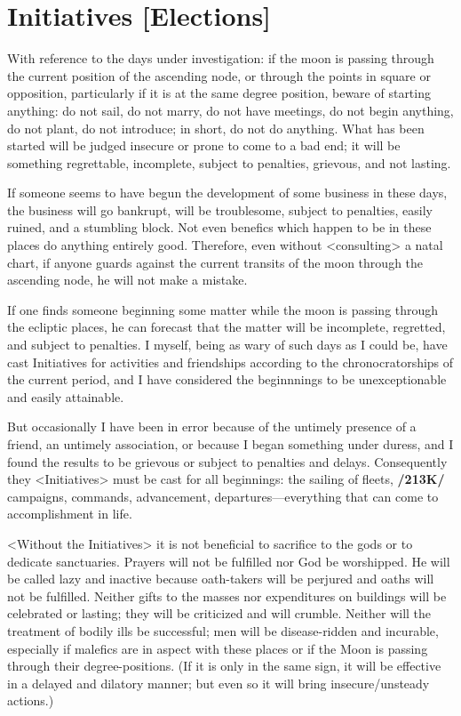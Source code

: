 \section{Initiatives [Elections]}

With reference to the days under investigation: if the moon is passing through the current position of the ascending node, or through the points in square or opposition, particularly if it is at the same degree position, beware of starting anything: do not sail, do not marry, do not have meetings, do not begin anything, do not plant, do not introduce; in short, do not do anything. What has been started will be judged insecure or prone to come to a bad end; it will be something regrettable, incomplete, subject to penalties, grievous, and not lasting.
 
 If someone seems to have begun the development of some business in these days, the business will go bankrupt, will be troublesome, subject to penalties, easily ruined, and a stumbling block. Not even benefics which happen to be in these places do anything entirely good.
Therefore, even without <consulting> a natal chart, if anyone guards against the current transits of the moon through the ascending node, he will not make a mistake.

If one finds someone beginning some matter while the moon is passing through the ecliptic places, he can forecast that the matter will be incomplete, regretted, and subject to penalties. I myself, being as wary of such days as I could be, have cast Initiatives for activities and friendships according to the chronocratorships of the current period, and I have considered the beginnnings to be unexceptionable and easily attainable. 

But occasionally I have been in error because of the untimely presence of a friend, an untimely association, or because I began something under duress, and I found the results to be grievous or subject to
penalties and delays. Consequently they <Initiatives> must be cast for all beginnings: the sailing of fleets, \textbf{/213K/} campaigns, commands, advancement, departures—everything that can come to accomplishment in life. 

<Without the Initiatives> it is not beneficial to sacrifice to the gods or to dedicate sanctuaries.  Prayers will not be fulfilled nor God be worshipped. He will be called lazy and inactive because oath-takers
will be perjured and oaths will not be fulfilled. Neither gifts to the masses nor expenditures on buildings will be celebrated or lasting; they will be criticized and will crumble. Neither will the treatment of bodily
ills be successful; men will be disease-ridden and incurable, especially if malefics are in aspect with these places or if the Moon is passing through their degree-positions. (If it is only in the same sign, it will be
effective in a delayed and dilatory manner; but even so it will bring insecure/unsteady actions.)

\newpage
